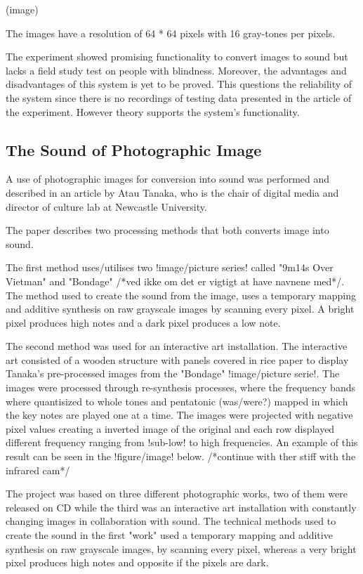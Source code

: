 (image)
  
The images have a resolution of 64 * 64 pixels with 16 gray-tones per pixels.  

The experiment showed promising functionality to convert images to sound but lacks a field study test on people with blindness. Moreover, the advantages and disadvantages of this system is yet to be proved. This questions the reliability of the system since there is no recordings of testing data presented in the article of the experiment. However theory supports the system's functionality. 

\subsection{The Sound of Photographic Image}\label{sec:soundarticle}

A use of photographic images for conversion into sound was performed and described in an article by Atau Tanaka, who is the chair of digital media and director of culture lab at Newcastle University.

The paper describes two processing methods that both converts image into sound.

The first method uses/utilises two !image/picture series! called "9m14s Over Vietman" and "Bondage" /*ved ikke om det er vigtigt at have navnene med*/. The method used to create the sound from the image, uses a temporary mapping and additive synthesis on raw grayscale images by scanning every pixel. A bright pixel produces high notes and a dark pixel produces a low note.

The second method was used for an interactive art installation. The interactive art consisted of a wooden structure with panels covered in rice paper to display Tanaka's pre-processed images from the "Bondage" !image/picture serie!. The images were processed through re-synthesis processes, where the frequency bands where quantisized to whole tones and pentatonic (was/were?) mapped in which the key notes are played one at a time. The images were projected with negative pixel values creating a inverted image of the original and each row displayed different frequency ranging from !sub-low! to high frequencies. An example of this result can be seen in the !figure/image! below. /*continue with ther stiff with the infrared cam*/


The project was based on three different photographic works, two of them were released on CD while the third was an interactive art installation with constantly changing images in collaboration with sound. The technical methods used to create the sound in the first "work" used a temporary mapping and additive synthesis on raw grayscale images, by scanning every pixel, whereas a very bright pixel produces high notes and opposite if the pixels are dark. 

